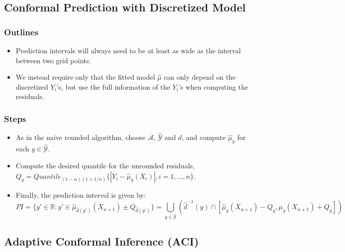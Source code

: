 \documentclass[11pt,a4paper]{article}
\begin{document}
\subsection{Conformal Prediction with Discretized Model}
\subsubsection{Outlines}
\begin{itemize}
    \item Prediction intervals will always need to be at least as wide as the interval between two grid points.
    \item We instead require only that the fitted model $\hat{\mu}$ can only depend on the discretized $Y_i$'s, but use the full information of the $Y_i$'s when computing the residuals.
\end{itemize}

\subsubsection{Steps}
\begin{itemize}
    \item As in the naive rounded algorithm, choose $\mathcal{A}$, $\hat{\mathcal{Y}}$ and $\hat{d}$, and compute $\hat{\mu}_y$ for each $y \in \hat{\mathcal{Y}}$.
    \item Compute the desired quantile for the unrounded residuals, $Q_y = Quantile_{(1-\alpha)(1+1/n)}\{|Y_i - \hat{\mu}_y(X_i)|, i = 1, \dots, n\}$.
    \item Finally, the prediction interval is given by:
    \[ PI = \{y' \in \mathbb{R} : y' \in \hat{\mu}_{\hat{d}(y')}(X_{n+1}) \pm Q_{\hat{d}(y')}\} = \bigcup_{y \in \hat{\mathcal{Y}}} (\hat{d}^{-1}(y) \cap [\hat{\mu}_y(X_{n+1}) - Q_y, \hat{\mu}_y(X_{n+1}) + Q_y]) \]
\end{itemize}


\subsection{Adaptive Conformal Inference (ACI)}
\end{document}
